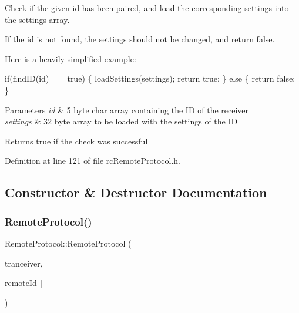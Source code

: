 Check if the given id has been paired, and load the corresponding settings into the settings array.

If the id is not found, the settings should not be changed, and return false.

Here is a heavily simplified example\+: 
\begin{DoxyCode}
\textcolor{keywordflow}{if}(findID(\textcolor{keywordtype}{id}) == \textcolor{keyword}{true}) \{
  loadSettings(settings);
  \textcolor{keywordflow}{return} \textcolor{keyword}{true};
\} \textcolor{keywordflow}{else} \{
  \textcolor{keywordflow}{return} \textcolor{keyword}{false};
\}
\end{DoxyCode}



\begin{DoxyParams}{Parameters}
{\em id} & 5 byte char array containing the ID of the receiver \\
\hline
{\em settings} & 32 byte array to be loaded with the settings of the ID\\
\hline
\end{DoxyParams}
\begin{DoxyReturn}{Returns}
true if the check was successful 
\end{DoxyReturn}


Definition at line 121 of file rc\+Remote\+Protocol.\+h.



\subsection{Constructor \& Destructor Documentation}
\mbox{\label{classRemoteProtocol_ac372a2187a4cdb43443834ad104b92e6}} 
\subsubsection{\texorpdfstring{Remote\+Protocol()}{RemoteProtocol()}}
{\footnotesize\ttfamily Remote\+Protocol\+::\+Remote\+Protocol (\begin{DoxyParamCaption}\item[{R\+F24 $\ast$}]{tranceiver,  }\item[{const uint8\+\_\+t}]{remote\+Id\mbox{[}$\,$\mbox{]} }\end{DoxyParamCaption})}

